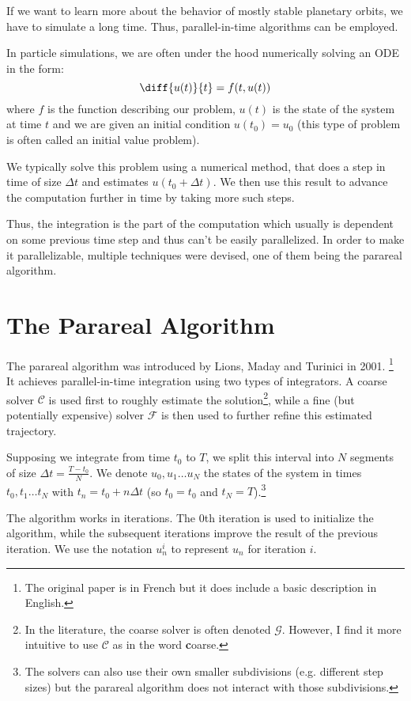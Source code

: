 \documentclass[conference]{IEEEtran}
\begin{document}
If we want to learn more about the behavior of mostly stable planetary orbits, we have to simulate a long time. Thus, parallel-in-time algorithms can be employed. \cite{parallelsolar}

In particle simulations, we are often under the hood numerically solving an ODE in the form:
$$
\diff{u(t)}{t} = f(t, u(t))
$$
where $f$ is the function describing our problem, $u(t)$ is the state of the system at time $t$ and we are given an initial condition $u(t_0) = u_0$ (this type of problem is often called an initial value problem).

We typically solve this problem using a numerical method, that does a step in time of size $\Delta t$ and estimates $u(t_0+\Delta t)$. We then use this result to advance the computation further in time by taking more such steps.

Thus, the integration is the part of the computation which usually is dependent on some previous time step and thus can't be easily parallelized. In order to make it parallelizable, multiple techniques were devised, one of them being the parareal algorithm.

\section{The Parareal Algorithm}

The parareal algorithm was introduced by Lions, Maday and Turinici in 2001. \cite{parareal}\footnote{The original paper is in French but it does include a basic description in English.} It achieves parallel-in-time integration using two types of integrators. A coarse solver $\mathcal{C}$ is used first to roughly estimate the solution\footnote{In the literature, the coarse solver is often denoted $\mathcal{G}$. However, I find it more intuitive to use $\mathcal{C}$ as in the word \textbf{c}oarse.}, while a fine (but potentially expensive) solver $\mathcal{F}$ is then used to further refine this estimated trajectory.

Supposing we integrate from time $t_0$ to $T$, we split this interval into $N$ segments of size $\Delta t = \frac{T-t_0}{N}$. We denote $u_0, u_1\dots u_N$ the states of the system in times $t_0, t_1\dots t_N$ with $t_n = t_0 + n\Delta t$ (so $t_0 = t_0$ and $t_N = T$).\footnote{The solvers can also use their own smaller subdivisions (e.g. different step sizes) but the parareal algorithm does not interact with those subdivisions.}

The algorithm works in iterations. The 0th iteration is used to initialize the algorithm, while the subsequent iterations improve the result of the previous iteration. We use the notation $u^i_n$ to represent $u_n$ for iteration $i$.
\end{document}
